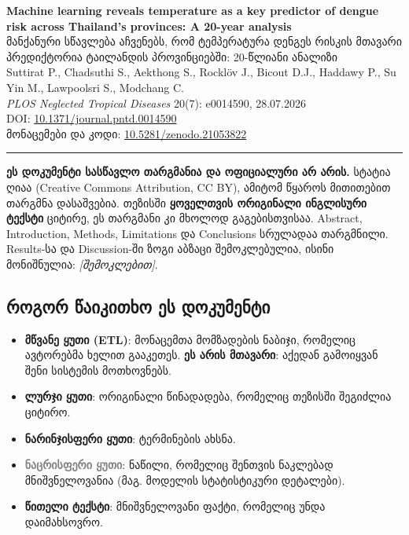 \documentclass[11pt,a4paper]{article}
\newcommand{\imp}[1]{\textbf{\color{importred}#1}}
\begin{document}
\begin{center}
  {\Large\bfseries Machine learning reveals temperature as a key predictor of dengue risk across Thailand's provinces: A 20-year analysis}\\[0.6em]
  {\large მანქანური სწავლება აჩვენებს, რომ ტემპერატურა დენგეს რისკის მთავარი პრედიქტორია ტაილანდის პროვინციებში: 20-წლიანი ანალიზი}\\[0.8em]
  Suttirat P., Chadsuthi S., Aekthong S., Rocklöv J., Bicout D.J., Haddawy P., Su Yin M., Lawpoolsri S., Modchang C.\\
  \textit{PLOS Neglected Tropical Diseases} 20(7): e0014590, 28.07.2026\\
  DOI: \href{https://doi.org/10.1371/journal.pntd.0014590}{10.1371/journal.pntd.0014590}\\
  მონაცემები და კოდი: \href{https://doi.org/10.5281/zenodo.21053822}{10.5281/zenodo.21053822}
\end{center}

\noindent\rule{\linewidth}{0.4pt}

\noindent\textbf{ეს დოკუმენტი სასწავლო თარგმანია და ოფიციალური არ არის.} სტატია ღიაა
(Creative Commons Attribution, CC BY), ამიტომ წყაროს მითითებით თარგმნა დასაშვებია.
თეზისში \imp{ყოველთვის ორიგინალი ინგლისური ტექსტი} ციტირე, ეს თარგმანი კი მხოლოდ გაგებისთვისაა.
Abstract, Introduction, Methods, Limitations და Conclusions სრულადაა თარგმნილი.
Results-სა და Discussion-ში ზოგი აბზაცი შემოკლებულია, ისინი მონიშნულია: \textit{[შემოკლებით]}.

\subsection*{როგორ წაიკითხო ეს დოკუმენტი}
\begin{itemize}[leftmargin=1.5em]
  \item \textcolor{brandgreen}{\textbf{მწვანე ყუთი (ETL)}}: მონაცემთა მომზადების ნაბიჯი, რომელიც ავტორებმა ხელით გააკეთეს. \imp{ეს არის მთავარი}: აქედან გამოიყვან შენი სისტემის მოთხოვნებს.
  \item \textcolor{quoteblue}{\textbf{ლურჯი ყუთი}}: ორიგინალი წინადადება, რომელიც თეზისში შეგიძლია ციტირო.
  \item \textcolor{termorange}{\textbf{ნარინჯისფერი ყუთი}}: ტერმინების ახსნა.
  \item \textcolor{gray}{\textbf{ნაცრისფერი ყუთი}}: ნაწილი, რომელიც შენთვის ნაკლებად მნიშვნელოვანია (მაგ. მოდელის სტატისტიკური დეტალები).
  \item \imp{წითელი ტექსტი}: მნიშვნელოვანი ფაქტი, რომელიც უნდა დაიმახსოვრო.
\end{itemize}
\end{document}
